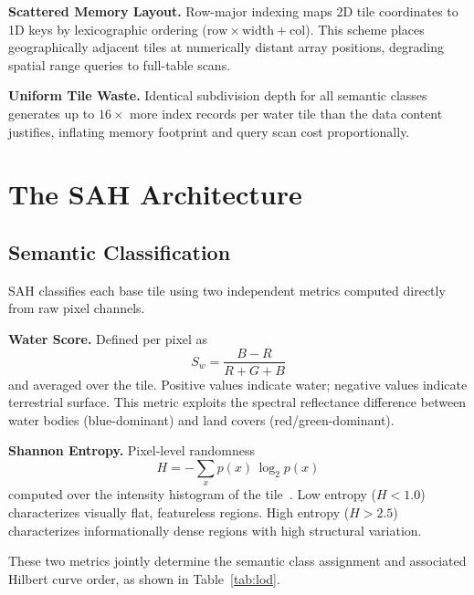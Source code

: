 \documentclass[conference]{IEEEtran}
\begin{document}
\textbf{Scattered Memory Layout.} Row-major indexing maps 2D tile coordinates
to 1D keys by lexicographic ordering ($\text{row} \times \text{width} +
\text{col}$). This scheme places geographically adjacent tiles at numerically
distant array positions, degrading spatial range queries to full-table scans.

\textbf{Uniform Tile Waste.} Identical subdivision depth for all semantic
classes generates up to $16\times$ more index records per water tile than the data content justifies, inflating memory footprint and query scan cost proportionally.

\section{The SAH Architecture}

\subsection{Semantic Classification}

SAH classifies each base tile using two independent metrics computed directly from raw pixel channels.

\textbf{Water Score.} Defined per pixel as
\begin{equation}
  S_w = \frac{B - R}{R + G + B}
  \label{eq:waterscore}
\end{equation}
and averaged over the tile. Positive values indicate water; negative values indicate terrestrial surface. This metric exploits the spectral reflectance difference between water bodies (blue-dominant) and land covers (red/green-dominant).

\textbf{Shannon Entropy.} Pixel-level randomness
\begin{equation}
  H = -\sum_{x} p(x)\,\log_2 p(x)
  \label{eq:entropy}
\end{equation}
computed over the intensity histogram of the tile~\cite{bariviera2024texture}. Low entropy ($H < 1.0$) characterizes visually flat, featureless regions. High entropy ($H > 2.5$) characterizes informationally dense regions with high structural variation.

These two metrics jointly determine the semantic class assignment and associated Hilbert curve order, as shown in Table~\ref{tab:lod}.
\end{document}

